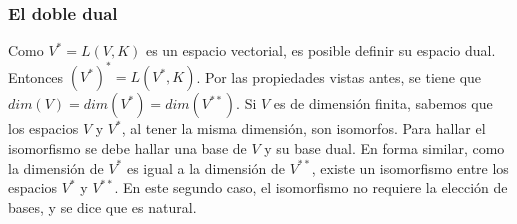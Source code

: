


















\bigskip


\bigskip


\subsubsection{El doble dual}

\bigskip

Como $V^*=L(V,K)$ es un espacio vectorial,  es posible definir su espacio  dual. Entonces $(V^*)^*=L(V^*,K)$. Por las propiedades vistas antes, se tiene que  $dim(V)=dim(V^*)=dim(V^{**})$.
Si $V$ es de dimensión finita, sabemos que los espacios $V$ y $V^*$, al tener la misma dimensión, son isomorfos. Para hallar el isomorfismo se debe hallar una base de $V$ y su base dual. En forma similar, como la dimensión de $V^*$  es igual a la dimensión de $V^{**}$, existe un isomorfismo  entre los espacios $V^*$ y $V^{**}$. En este segundo caso,  el isomorfismo  no requiere la elección de bases, y se dice que es natural. 

